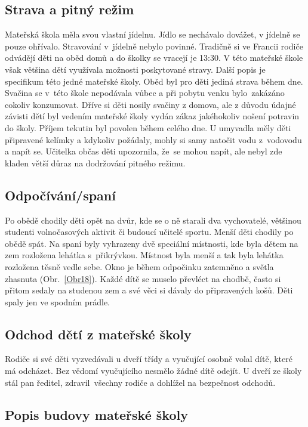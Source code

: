 		\subsection{Strava a pitný režim}
			Mateřská škola měla svou vlastní jídelnu. Jídlo se nechávalo dovážet, v jídelně se pouze ohřívalo. Stravování v jídelně nebylo povinné. Tradičně si ve Francii rodiče odvádějí děti na oběd domů a do školky se vracejí je 13:30. V této mateřské škole však většina dětí využívala možnosti poskytované stravy. 
			Další popis je specifikum této jedné mateřské školy. Oběd byl pro děti jediná strava během dne. Svačina se v této škole nepodávala vůbec a při pobytu venku bylo zakázáno cokoliv konzumovat. Dříve si děti nosily svačiny z domova, ale z důvodu údajné závisti dětí byl vedením mateřské školy vydán zákaz jakéhokoliv nošení potravin do školy. 
			Příjem tekutin byl povolen během celého dne. U umyvadla měly děti připravené kelímky a kdykoliv požádaly, mohly si samy natočit vodu z vodovodu a napít se. Učitelka občas děti upozornila, že se mohou napít, ale nebyl zde kladen větší důraz na dodržování pitného režimu.

		\subsection{Odpočívání/spaní}
		\label{spani}
			Po obědě chodily děti opět na dvůr, kde se o ně starali dva vychovatelé, většinou studenti volnočasových aktivit či budoucí učitelé sportu.
			Menší děti chodily po obědě spát. Na spaní byly vyhrazeny dvě speciální místnosti, kde byla dětem na zem rozložena lehátka s přikrývkou. Místnost byla menší a tak byla lehátka rozložena těsně vedle sebe. Okno je během odpočinku zatemněno a světla zhasnuta (Obr.~\ref{Obr18}).
			Každé dítě se muselo převléct na chodbě, často si přitom sedaly na studenou zem a své věci si dávaly do připravených košů. Děti spaly jen ve spodním prádle. 	

		\subsection{Odchod dětí z mateřské školy}
			Rodiče si své děti vyzvedávali u dveří třídy a vyučující osobně volal dítě, které má odcházet. Bez vědomí vyučujícího nesmělo žádné dítě odejít. U dveří ze školy stál pan ředitel, zdravil všechny rodiče a dohlížel na bezpečnost odchodů. 

		\subsection{Popis budovy mateřské školy}

